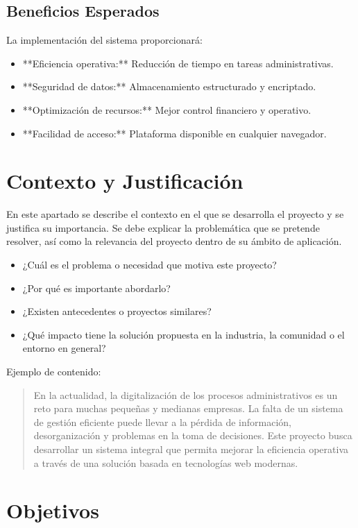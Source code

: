 \subsection{Beneficios Esperados}
La implementación del sistema proporcionará:
\begin{itemize}
	\item **Eficiencia operativa:** Reducción de tiempo en tareas administrativas.
	\item **Seguridad de datos:** Almacenamiento estructurado y encriptado.
	\item **Optimización de recursos:** Mejor control financiero y operativo.
	\item **Facilidad de acceso:** Plataforma disponible en cualquier navegador.
\end{itemize}

\section{Contexto y Justificación}

En este apartado se describe el contexto en el que se desarrolla el proyecto y se justifica su importancia. Se debe explicar la problemática que se pretende resolver, así como la relevancia del proyecto dentro de su ámbito de aplicación.

\begin{itemize}
	\item ¿Cuál es el problema o necesidad que motiva este proyecto?
	\item ¿Por qué es importante abordarlo?
	\item ¿Existen antecedentes o proyectos similares?
	\item ¿Qué impacto tiene la solución propuesta en la industria, la comunidad o el entorno en general?
\end{itemize}

Ejemplo de contenido:

\begin{quote}
	En la actualidad, la digitalización de los procesos administrativos es un reto para muchas pequeñas y medianas empresas. La falta de un sistema de gestión eficiente puede llevar a la pérdida de información, desorganización y problemas en la toma de decisiones. Este proyecto busca desarrollar un sistema integral que permita mejorar la eficiencia operativa a través de una solución basada en tecnologías web modernas.
\end{quote}

\section{Objetivos}

